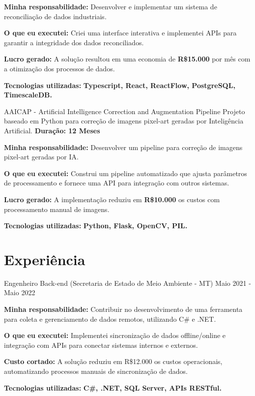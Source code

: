 \resumeItemListStart
\item \textbf{Minha responsabilidade:} Desenvolver e implementar um sistema de reconciliação de dados industriais.
\item \textbf{O que eu executei:} Criei uma interface interativa e implementei APIs para garantir a integridade dos dados reconciliados.
\item \textbf{Lucro gerado:} A solução resultou em uma economia de \textbf{R\$15.000} por mês com a otimização dos processos de dados.
\item \textbf{Tecnologias utilizadas:} \textbf{Typescript, React, ReactFlow, PostgreSQL, TimescaleDB.}
\resumeItemListEnd

\vspace{-2mm}

\resumeProject
{ AAICAP - \textmd{Artificial Intelligence Correction and Augmentation Pipeline}}
{Projeto baseado em Python para correção de imagens pixel-art geradas por Inteligência Artificial.}
{\textbf{Duração: 12 Meses}}

\resumeItemListStart
\item \textbf{Minha responsabilidade:} Desenvolver um pipeline para correção de imagens pixel-art geradas por IA.
\item \textbf{O que eu executei:} Construi um pipeline automatizado que ajusta parâmetros de processamento e fornece uma API para integração com outros sistemas.
\item \textbf{Lucro gerado:} A implementação reduziu em \textbf{R\$10.000} os custos com processamento manual de imagens.
\item \textbf{Tecnologias utilizadas:} \textbf{Python, Flask, OpenCV, PIL.}
\resumeItemListEnd

\resumeSubHeadingListEnd
\vspace{-8.5mm}

\section{\textbf{Experiência}}
\resumeSubHeadingListStart
\resumeSubheading
{ Engenheiro Back-end \textmd{(Secretaria de Estado de Meio Ambiente - MT)}}{}
{}{Maio 2021 - Maio 2022}
\vspace{-2.0mm}
\resumeItemListStart
\item \textbf{Minha responsabilidade:} Contribuir no desenvolvimento de uma ferramenta para coleta e gerenciamento de dados remotos, utilizando C\# e .NET.
\item \textbf{O que eu executei:} Implementei sincronização de dados offline/online e integração com APIs para conectar sistemas internos e externos.
\item \textbf{Custo cortado:} A solução reduziu em R\$12.000 os custos operacionais, automatizando processos manuais de sincronização de dados.
\item \textbf{Tecnologias utilizadas:} \textbf{C\#, .NET, SQL Server, APIs RESTful.}
\resumeItemListEnd

